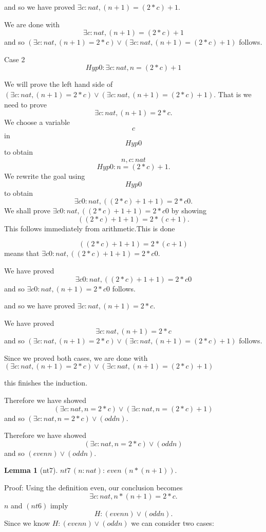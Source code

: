 \documentclass[11pt, oneside]{article}
\newtheorem{Lemma}{Lemma}
\begin{document}
 and so we have proved $\exists c : nat, (n + 1) = (2 * c) + 1 $.

 We are done with $$\exists c : nat, (n + 1) = (2 * c) + 1 $$ and so $(\exists c : nat, (n + 1) = 2 * c) \lor (\exists c : nat, (n + 1) = (2 * c) + 1) $ follows.

 

 Case 2 $$Hyp0 : \exists c : nat, n = (2 * c) + 1 $$

 We will prove the left hand side of $(\exists c : nat, (n + 1) = 2 * c) \lor (\exists c : nat, (n + 1) = (2 * c) + 1) $. That is we need to prove $$\exists c : nat, (n + 1) = 2 * c .$$ We choose a variable $$c$$ in $$Hyp0 $$ to obtain $$n, c : nat $$ $$Hyp0 : n = (2 * c) + 1 .$$ We rewrite the goal using $$Hyp0 $$ to obtain $$\exists c0 : nat, ((2 * c) + 1 + 1) = 2 * c0 .$$We shall prove $\exists c0 : nat, ((2 * c) + 1 + 1) = 2 * c0 $ by showing $$((2 * c) + 1 + 1) = 2 * (c + 1) .$$This follows immediately from arithmetic.This is done

 $$((2 * c) + 1 + 1) = 2 * (c + 1) $$ means that $\exists c0 : nat, ((2 * c) + 1 + 1) = 2 * c0 $.

 We have proved $$\exists c0 : nat, ((2 * c) + 1 + 1) = 2 * c0 $$ and so $\exists c0 : nat, (n + 1) = 2 * c0 $ follows.

 and so we have proved $\exists c : nat, (n + 1) = 2 * c $.

 We have proved $$\exists c : nat, (n + 1) = 2 * c $$ and so $(\exists c : nat, (n + 1) = 2 * c) \lor (\exists c : nat, (n + 1) = (2 * c) + 1) $ follows.

 Since we proved both cases, we are done with $(\exists c : nat, (n + 1) = 2 * c) \lor (\exists c : nat, (n + 1) = (2 * c) + 1) $

 this finishes the induction.

 Therefore we have showed $$(\exists c : nat, n = 2 * c) \lor (\exists c : nat, n = (2 * c) + 1) $$ and so $(\exists c : nat, n = 2 * c) \lor (odd n) $.

 Therefore we have showed $$(\exists c : nat, n = 2 * c) \lor (odd n) $$ and so $(even n) \lor (odd n) $.\begin{Lemma}[nt7] \label{Lemma:nt7}
$nt7\,(n:nat):\,even\,(n*(n+1)).$
 \end{Lemma}


 Proof: Using the definition even, our conclusion becomes $$\exists c : nat, n * (n + 1) = 2 * c .$$$n$ and $(nt6)$ imply $$H : (even n) \lor (odd n) .$$ Since we know $H : (even n) \lor (odd n) $ we can consider two cases: 
\end{document}
